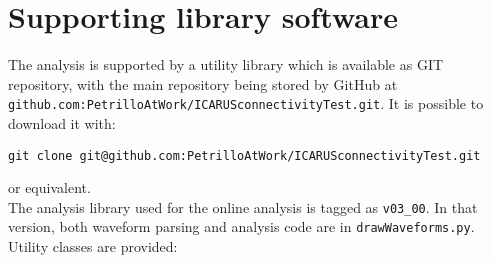 \section{Supporting library software}
\label{app:supporting-library-software}

The analysis is supported by a utility library which is available as GIT
repository, with the main repository being stored by GitHub at
\texttt{github.com:PetrilloAtWork/ICARUSconnectivityTest.git}. It is
possible to download it with:

\begin{verbatim}
git clone git@github.com:PetrilloAtWork/ICARUSconnectivityTest.git
\end{verbatim}

or equivalent.\\

The analysis library used for the online analysis is tagged as
\texttt{v03\_00}. In that version, both waveform parsing and analysis
code are in \texttt{drawWaveforms.py}.\\

Utility classes are provided:

